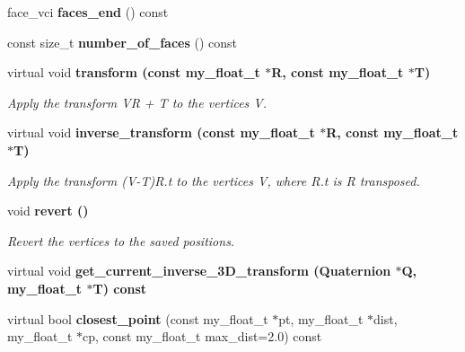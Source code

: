 \begin{CompactItemize}
\item 
face\_\-vci \textbf{faces\_\-end} () const \label{classSimSite3D_1_1geometry_1_1SimpleTrimeshTwo_3f250221a3eadd745219cc7865475fc9}

\item 
const size\_\-t \textbf{number\_\-of\_\-faces} () const \label{classSimSite3D_1_1geometry_1_1SimpleTrimeshTwo_8e65a9b44ae0f2edb2814bf382636488}

\item 
virtual void \bf{transform} (const my\_\-float\_\-t $\ast$R, const my\_\-float\_\-t $\ast$T)\label{classSimSite3D_1_1geometry_1_1SimpleTrimeshTwo_b0eec9fa72b96f2a62c1f116bd93a661}

\begin{CompactList}\small\item\em Apply the transform VR + T to the vertices V. \item\end{CompactList}\item 
virtual void \bf{inverse\_\-transform} (const my\_\-float\_\-t $\ast$R, const my\_\-float\_\-t $\ast$T)\label{classSimSite3D_1_1geometry_1_1SimpleTrimeshTwo_984f0b676e30e0e507e3cda27316ceea}

\begin{CompactList}\small\item\em Apply the transform (V-T)R.t to the vertices V, where R.t is R transposed. \item\end{CompactList}\item 
void \bf{revert} ()\label{classSimSite3D_1_1geometry_1_1SimpleTrimeshTwo_925bef71cba895382a4620e52ae4316e}

\begin{CompactList}\small\item\em Revert the vertices to the saved positions. \item\end{CompactList}\item 
virtual void \bf{get\_\-current\_\-inverse\_\-3D\_\-transform} (Quaternion $\ast$Q, my\_\-float\_\-t $\ast$T) const 
\item 
virtual bool \textbf{closest\_\-point} (const my\_\-float\_\-t $\ast$pt, my\_\-float\_\-t $\ast$dist, my\_\-float\_\-t $\ast$cp, const my\_\-float\_\-t max\_\-dist=2.0) const \label{classSimSite3D_1_1geometry_1_1SimpleTrimeshTwo_518278360584dcb1c13344689a62e3f9}


\end{CompactItemize}
